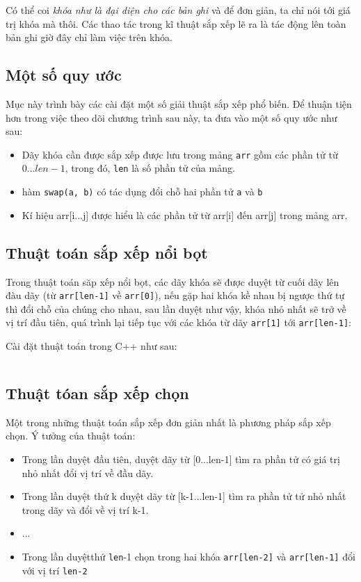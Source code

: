 \documentclass[a4paper]{article}
\newcommand{\mnt}[1]{\inputminted[frame=single, linenos=true, tabsize=4]{c++}{#1}}
\begin{document}
Có thể coi \emph{khóa như là đại diện cho các bản ghi} và để đơn giản, ta chỉ nói tới giá trị khóa mà thôi. Các thao tác trong kĩ thuật sắp xếp lẽ ra là tác động lên toàn bản ghi giờ đây chỉ làm việc trên khóa.

\subsection{Một số quy ước}
Mục này trình bày các cài đặt một số giải thuật sắp xếp phổ biến. Để thuận tiện hơn trong việc theo dõi chương trình sau này, ta đưa vào một số quy ước như sau:\\
\begin{itemize}
\item Dãy khóa cần được sắp xếp được lưu trong mảng \texttt{arr} gồm các phần tử từ $0...len-1$, trong đó, \texttt{len} là số phần tử của mảng.
\item hàm \texttt{swap(a, b)} có tác dụng đổi chỗ hai phần tử \texttt{a} và \texttt{b}
\item Kí hiệu arr[i...j] được hiểu là các phần tử từ arr[i] đến arr[j] trong mảng arr.
\end{itemize}

\subsection{Thuật toán sắp xếp nổi bọt}

Trong thuật toán săp xếp nổi bọt, các dãy khóa sẽ được duyệt từ cuối dãy lên đàu dãy (từ \texttt{arr[len-1]} về \texttt{arr[0]}), nếu gặp hai khóa kề nhau bị ngược thứ tự thì đổi chỗ của chúng cho nhau, sau lần duyệt như vậy, khóa nhỏ nhất sẽ trở về vị trí đầu tiên, quá trình lại tiếp tục với các khóa từ dãy \texttt{arr[1]} tới \texttt{arr[len-1]}:

Cài đặt thuật toán trong C++ như sau:
\mnt{src/bublesort.cpp}

\subsection{Thuật tóan sắp xếp chọn}

Một trong những thuật toán sắp xếp đơn giản nhất là phương pháp sắp xếp chọn. Ý tưởng của thuật toán:
\begin{itemize}
\item Trong lần duyệt đầu tiên, duyệt dãy từ [0...len-1] tìm ra phần tử có giá trị nhỏ nhất đổi vị trí về đầu dãy.
\item Trong lần duyệt thứ k duyệt dãy từ [k-1...len-1] tìm ra phần tử tử nhỏ nhất trong dãy và đổi về vị trí k-1.
\item ...
\item Trong lần duyệtthứ \texttt{len}-1 chọn trong hai khóa \texttt{arr[len-2]} và \texttt{arr[len-1]} đổi với vị trí \texttt{len-2}
\end{itemize}
\end{document}
